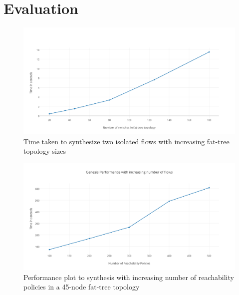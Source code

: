 \documentclass[]{sig}
\begin{document}
 

\section{Evaluation}
\begin{figure} 
	\includegraphics[width=20cm]{GenesisTopo.png}
	\caption{Time taken to synthesize two isolated flows with increasing fat-tree topology sizes}
	\label{fig:topo}
\end{figure}
\begin{figure} 
	\includegraphics[width=20cm]{GenesisReach.png}
	\caption{Performance plot to synthesis with increasing number of reachability policies in a 45-node fat-tree topology}
	\label{fig:reach}
\end{figure}
\end{document}

